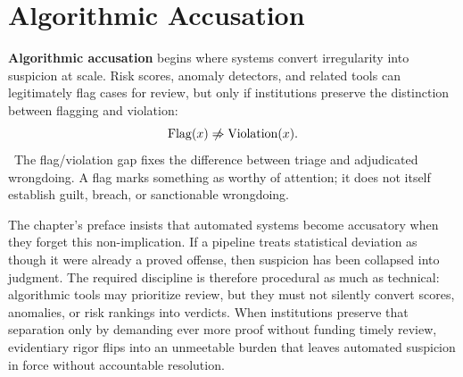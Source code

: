 
\chapter{Algorithmic Accusation}
\label{ch:ch069}


\textbf{Algorithmic accusation} begins where systems convert irregularity into suspicion at scale. Risk scores, anomaly detectors, and related tools can legitimately flag cases for review, but only if institutions preserve the distinction between flagging and violation:
\[
\operatorname{Flag}(x)
\centernot\Rightarrow
\operatorname{Violation}(x).
\]
\Definition\ The flag/violation gap fixes the difference between triage and adjudicated wrongdoing.
A flag marks something as worthy of attention; it does not itself establish guilt, breach, or sanctionable wrongdoing.

The chapter's preface insists that automated systems become accusatory when they forget this non-implication. If a pipeline treats statistical deviation as though it were already a proved offense, then suspicion has been collapsed into judgment. The required discipline is therefore procedural as much as technical: algorithmic tools may prioritize review, but they must not silently convert scores, anomalies, or risk rankings into verdicts. When institutions preserve that separation only by demanding ever more proof without funding timely review, evidentiary rigor flips into an unmeetable burden that leaves automated suspicion in force without accountable resolution.

